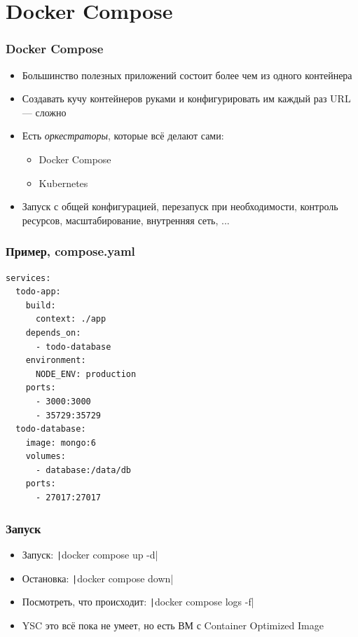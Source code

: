 \documentclass{../../slides-style}
\begin{document}
    \section{Docker Compose}

    \begin{frame}
        \frametitle{Docker Compose}
        \begin{itemize}
            \item Большинство полезных приложений состоит более чем из одного контейнера
            \item Создавать кучу контейнеров руками и конфигурировать им каждый раз URL --- сложно
            \item Есть \emph{оркестраторы}, которые всё делают сами:
            \begin{itemize}
                \item Docker Compose
                \item Kubernetes
            \end{itemize}
            \item Запуск с общей конфигурацией, перезапуск при необходимости, контроль ресурсов, масштабирование, внутренняя сеть, ...
        \end{itemize}
    \end{frame}

    \begin{frame}[fragile]
        \frametitle{Пример, compose.yaml}
        \begin{scriptsize}
            \begin{verbatim}
services:
  todo-app:
    build:
      context: ./app
    depends_on:
      - todo-database
    environment:
      NODE_ENV: production
    ports:
      - 3000:3000
      - 35729:35729
  todo-database:
    image: mongo:6
    volumes: 
      - database:/data/db
    ports:
      - 27017:27017
            \end{verbatim}
        \end{scriptsize}
    \end{frame}

    \begin{frame}
        \frametitle{Запуск}
        \begin{itemize}
            \item Запуск: \texttt|docker compose up -d|
            \item Остановка: \texttt|docker compose down|
            \item Посмотреть, что происходит: \texttt|docker compose logs -f|
            \item YSC это всё пока не умеет, но есть ВМ с Container Optimized Image
        \end{itemize}
    \end{frame}
\end{document}

